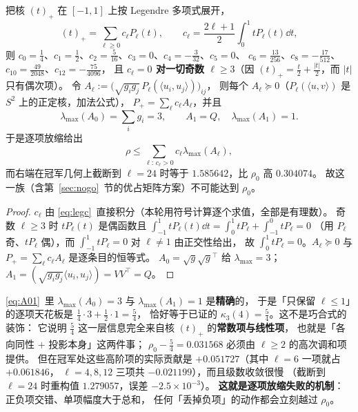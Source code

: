 \begin{proposition}\label{prop:ceilharm}
把核 $(t)_+$ 在 $[-1,1]$ 上按 Legendre 多项式展开，
\begin{equation}\label{eq:legc}
(t)_+=\sum_{\ell\ge0}c_\ell P_\ell(t),\qquad
c_\ell=\frac{2\ell+1}{2}\int_0^1tP_\ell(t)\dd t ,
\end{equation}
则 $c_0=\frac14$、$c_1=\frac12$、$c_2=\frac5{16}$、$c_3=0$、$c_4=-\frac3{32}$、$c_5=0$、
$c_6=\frac{13}{256}$、$c_8=-\frac{17}{512}$、$c_{10}=\frac{49}{2048}$、$c_{12}=-\frac{75}{4096}$，
且 \textbf{$c_\ell=0$ 对一切奇数 $\ell\ge3$}（因 $(t)_+=\frac t2+\frac{|t|}2$，而 $|t|$ 只有偶次项）。
令 $A_\ell:=\bigl(\sqrt{g_ig_j}\,P_\ell(\langle u_i,u_j\rangle)\bigr)_{ij}$，
则每个 $A_\ell\succeq0$（$P_\ell(\langle u,v\rangle)$ 是 $S^2$ 上的正定核，加法公式），
$P_+=\sum_\ell c_\ell A_\ell$，并且
\begin{equation}\label{eq:A01}
\lambda_{\max}(A_0)=\sum_ig_i=3,\qquad A_1=Q,\quad \lambda_{\max}(A_1)=1 .
\end{equation}
于是逐项放缩给出
\[
\rho\le\sum_{\ell:\,c_\ell>0}c_\ell\lambda_{\max}(A_\ell),
\]
而右端在冠军几何上截断到 $\ell=24$ 时等于 $1.585642$，比 $\rho_0$ 高 $0.304074$。
故这一族（含第~\ref{sec:nogo}~节的优占矩阵方案）不可能达到 $\rho_0$。
\end{proposition}

\begin{proof}
$c_\ell$ 由 \eqref{eq:legc}~直接积分（本轮用符号计算逐个求值，全部是有理数）。
奇数 $\ell\ge3$ 时 $tP_\ell(t)$ 是偶函数且 $\int_{-1}^1tP_\ell(t)\dd t=\int_0^1tP_\ell+\int_{-1}^0tP_\ell=0$
（用 $P_\ell$ 奇、$tP_\ell$ 偶），而 $\int_{-1}^1tP_\ell=0$ 对 $\ell\ne1$ 由正交性给出，
故 $\int_0^1tP_\ell=0$。$A_\ell\succeq0$ 与 $P_+=\sum_\ell c_\ell A_\ell$ 是逐条目的恒等式。
$A_0=\sqrt g\sqrt g{}^\top$ 给 $\lambda_{\max}=3$；$A_1=(\sqrt{g_ig_j}\langle u_i,u_j\rangle)=VV^\top=Q$。
\end{proof}

\begin{remark}[这条否证解释了一个数字]\label{rmk:harm54}
\eqref{eq:A01}~里 $\lambda_{\max}(A_0)=3$ 与 $\lambda_{\max}(A_1)=1$ 是\textbf{精确}的，
于是「只保留 $\ell\le1$」的逐项天花板是 $\frac14\cdot3+\frac12\cdot1=\frac54$，
恰好等于已证的 $\kappa_3(4)=\frac54$。这不是巧合式的装饰：
它说明 $\frac54$ 这一层信息完全来自核 $(t)_+$ 的\textbf{常数项与线性项}，
也就是「各向同性 $+$ 投影本身」这两件事；
$\rho_0-\frac54=0.031568$ 必须由 $\ell\ge2$ 的高次调和项提供。
但在冠军处这些高阶项的实际贡献是 $+0.051727$（其中 $\ell=6$ 一项就占 $+0.061846$，
$\ell=4,8,12$ 三项共 $-0.021199$），而且级数收敛很慢
（截断到 $\ell=24$ 时重构值 $1.279057$，误差 $-2.5\times10^{-3}$）。
\textbf{这就是逐项放缩失败的机制}：正负项交错、单项幅度大于总和，
任何「丢掉负项」的动作都会立刻越过 $\rho_0$。
\end{remark}


